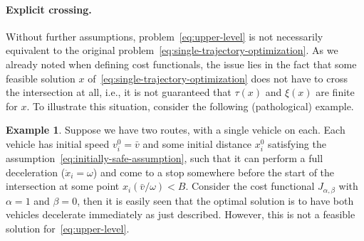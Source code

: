 \documentclass[a4paper]{report}
\theoremstyle{definition}
\newtheorem{eg}{Example}[chapter]
\theoremstyle{plain}
\begin{document}
\paragraph{Explicit crossing.}
Without further assumptions, problem~\eqref{eq:upper-level} is not necessarily
equivalent to the original problem~\eqref{eq:single-trajectory-optimization}.
%
As we already noted when defining cost functionals, the issue lies in the fact
that some feasible solution $x$ of~\eqref{eq:single-trajectory-optimization} does not have to cross the intersection
at all, i.e., it is not guaranteed that $\tau(x)$ and $\xi(x)$ are finite for $x$.
%
To illustrate this situation, consider the following (pathological) example.
\begin{eg}
  Suppose we have two routes, with a single vehicle on each. Each vehicle has
  initial speed $v_{i}^{0} = \bar{v}$ and some initial distance $x_{i}^{0}$
  satisfying the assumption~\eqref{eq:initially-safe-assumption}, such that it can perform a full deceleration
  ($\ddot{x}_{i} = \omega$) and come to a stop somewhere before the start of the
  intersection at some point $x_{i}(\bar{v}/\omega) < B$. Consider the cost functional
  $J_{\alpha,\beta}$ with $\alpha = 1$ and $\beta = 0$, then it is easily seen
  that the optimal solution is to have both vehicles decelerate immediately as
  just described.
  However, this is not a feasible solution for~\eqref{eq:upper-level}.
\end{eg}
\end{document}
